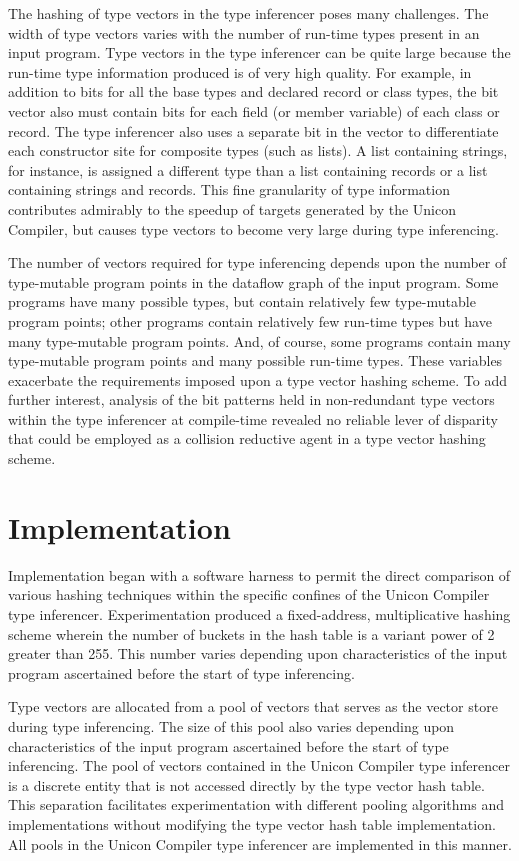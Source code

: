 The hashing of type vectors in the type inferencer poses many
challenges. The width of type vectors varies with the number of
run-time types present in an input program. Type vectors in the type
inferencer can be quite large because the run-time type information
produced is of very high quality. For example, in addition to bits for
all the base types and declared record or class types, the bit vector
also must contain bits for each field (or member variable) of each
class or record. The type inferencer also uses a separate bit in the
vector to differentiate each constructor site for composite types
(such as lists). A list containing strings, for instance, is assigned
a different type than a list containing records or a list containing
strings and records. This fine granularity of type information
contributes admirably to the speedup of targets generated by the
Unicon Compiler, but causes type vectors to become very large during
type inferencing.

The number of vectors required for type inferencing depends upon the
number of type-mutable program points in the dataflow graph of the
input program. Some programs have many possible types, but contain
relatively few type-mutable program points; other programs contain
relatively few run-time types but have many type-mutable program
points. And, of course, some programs contain many type-mutable
program points and many possible run-time types. These variables
exacerbate the requirements imposed upon a type vector hashing
scheme. To add further interest, analysis of the bit patterns held in
non-redundant type vectors within the type inferencer at compile-time
revealed no reliable lever of disparity that could be employed as a
collision reductive agent in a type vector hashing scheme.

\section{Implementation}

Implementation began with a software harness to permit the direct
comparison of various hashing techniques within the specific confines
of the Unicon Compiler type inferencer. Experimentation produced a
fixed-address, multiplicative hashing scheme wherein the number of
buckets in the hash table is a variant power of 2 greater than
255. This number varies depending upon characteristics of the input
program ascertained before the start of type inferencing.

Type vectors are allocated from a pool of vectors that serves as the
vector store during type inferencing. The size of this pool also
varies depending upon characteristics of the input program ascertained
before the start of type inferencing. The pool of vectors contained in
the Unicon Compiler type inferencer is a discrete entity that is not
accessed directly by the type vector hash table. This separation
facilitates experimentation with different pooling algorithms and
implementations without modifying the type vector hash table
implementation. All pools in the Unicon Compiler type inferencer are
implemented in this manner.

